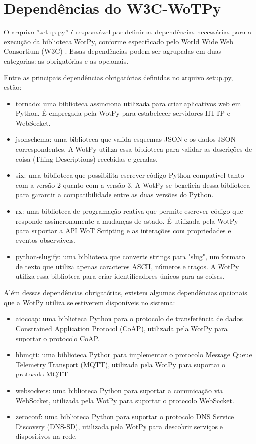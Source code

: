 \section{Dependências do W3C-WoTPy}

O arquivo ''setup.py''  é responsável por definir as dependências necessárias para a execução da biblioteca WotPy, conforme especificado pelo World Wide Web Consortium (W3C) \cite{WoTArchitecture}. Essas dependências podem ser agrupadas em duas categorias: as obrigatórias e as opcionais.

Entre as principais dependências obrigatórias definidas no arquivo setup.py, estão:

\begin{itemize}
    \item tornado: uma biblioteca assíncrona utilizada para criar aplicativos web em Python. É empregada pela WotPy para estabelecer servidores HTTP e WebSocket.
    \item jsonschema: uma biblioteca que valida esquemas JSON e os dados JSON correspondentes. A WotPy utiliza essa biblioteca para validar as descrições de coisa (Thing Descriptions) recebidas e geradas.
    \item six: uma biblioteca que possibilita escrever código Python compatível tanto com a versão 2 quanto com a versão 3. A WotPy se beneficia dessa biblioteca para garantir a compatibilidade entre as duas versões do Python.
    \item rx: uma biblioteca de programação reativa que permite escrever código que responde assincronamente a mudanças de estado. É utilizada pela WotPy para suportar a API WoT Scripting e as interações com propriedades e eventos observáveis.
    \item python-slugify: uma biblioteca que converte strings para "slug", um formato de texto que utiliza apenas caracteres ASCII, números e traços. A WotPy utiliza essa biblioteca para criar identificadores únicos para as coisas.
\end{itemize}

Além dessas dependências obrigatórias, existem algumas dependências opcionais que a WotPy utiliza se estiverem disponíveis no sistema:

\begin{itemize}
    \item aiocoap: uma biblioteca Python para o protocolo de transferência de dados Constrained Application Protocol (CoAP), utilizada pela WotPy para suportar o protocolo CoAP.
    \item hbmqtt: uma biblioteca Python para implementar o protocolo Message Queue Telemetry Transport (MQTT), utilizada pela WotPy para suportar o protocolo MQTT.
    \item websockets: uma biblioteca Python para suportar a comunicação via WebSocket, utilizada pela WotPy para suportar o protocolo WebSocket.
    \item zeroconf: uma biblioteca Python para suportar o protocolo DNS Service Discovery (DNS-SD), utilizada pela WotPy para descobrir serviços e dispositivos na rede.
\end{itemize}

